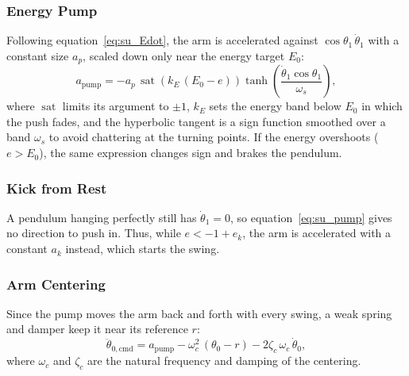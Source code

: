 \documentclass[a4paper,11pt]{article}
\begin{document}
\subsubsection{Energy Pump}
Following equation~\ref{eq:su_Edot}, the arm is accelerated against $\cos\theta_1\,\dot\theta_1$ with a constant size $a_p$, scaled down only near the energy target $E_0$:
\begin{equation}
  a_{\mathrm{pump}} = -a_p\, \operatorname{sat}\!\left(k_E\, (E_0 - e)\right) \tanh\!\left( \frac{\dot\theta_1 \cos\theta_1}{\omega_s} \right),
  \label{eq:su_pump}
\end{equation}
where $\operatorname{sat}$ limits its argument to $\pm 1$, $k_E$ sets the energy band below $E_0$ in which the push fades, and the hyperbolic tangent is a sign function smoothed over a band $\omega_s$ to avoid chattering at the turning points. If the energy overshoots ($e > E_0$), the same expression changes sign and brakes the pendulum.

\subsubsection{Kick from Rest}
A pendulum hanging perfectly still has $\dot\theta_1 = 0$, so equation~\ref{eq:su_pump} gives no direction to push in. Thus, while $e < -1 + e_k$, the arm is accelerated with a constant $a_k$ instead, which starts the swing.

\subsubsection{Arm Centering}
Since the pump moves the arm back and forth with every swing, a weak spring and damper keep it near its reference $r$:
\begin{equation}
  \ddot\theta_{0,\mathrm{cmd}} = a_{\mathrm{pump}} - \omega_c^2\, (\theta_0 - r) - 2\zeta_c\, \omega_c\, \dot\theta_0 ,
  \label{eq:su_center}
\end{equation}
where $\omega_c$ and $\zeta_c$ are the natural frequency and damping of the centering.
\end{document}

